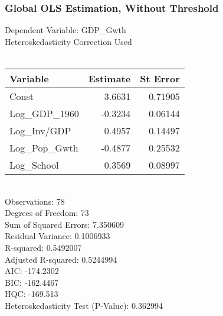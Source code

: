 \subsubsection{Global OLS Estimation, Without Threshold} 
Dependent Variable:      GDP\_Gwth \\
Heteroskedasticity Correction Used \\\\
\begin{tabular}{l*{2}{r}}
\toprule
Variable    &   Estimate     &   St Error \\
\midrule 
Const   &    3.6631   &   0.71905 \\
Log\_GDP\_1960   &   -0.3234   &   0.06144 \\
Log\_Inv/GDP   &    0.4957   &   0.14497 \\
Log\_Pop\_Gwth   &   -0.4877   &   0.25532 \\
Log\_School   &    0.3569   &   0.08997 \\
\bottomrule
\end{tabular}
\bigskip \\
Observations:                       78 \\
Degrees of Freedom:                 73 \\
Sum of Squared Errors:              7.350609 \\
Residual Variance:                  0.1006933 \\
R-squared:                          0.5492007 \\
Adjusted R-squared:                 0.5244994 \\
AIC:                                -174.2302 \\
BIC:                                -162.4467 \\
HQC:                                -169.513 \\
Heteroskedasticity Test (P-Value):  0.362994 \\

